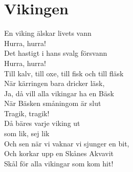 \section{Vikingen}
En viking älskar livets vann\\
Hurra, hurra!\\
Det hastigt i hans svalg försvann\\
Hurra, hurra!\\
Till kalv, till oxe, till fisk och till fläsk\\
När kärringen bara dricker läsk,\\
Ja, då vill alla vikingar ha en Bäsk\\
När Bäsken småningom är slut\\
Tragik, tragik!\\
Då bäres varje viking ut\\
som lik, sej lik\\
Och sen när vi vaknar vi sjunger en bit,\\
Och korkar upp en Skånes Akvavit\\
Skål för alla vikingar som kom hit!\\

